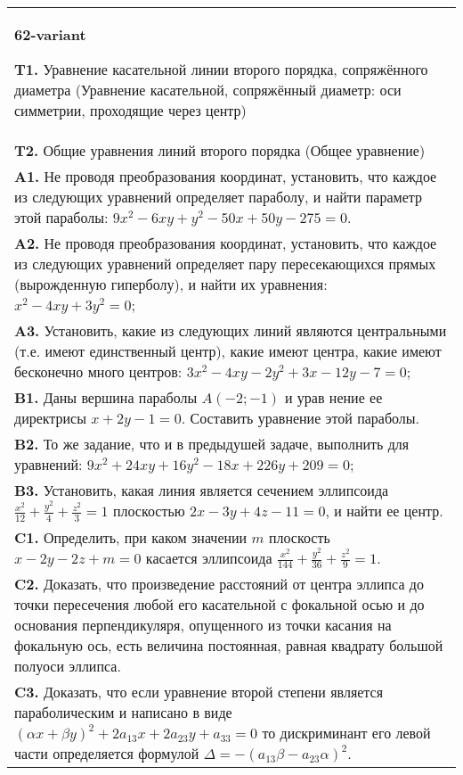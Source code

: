 \documentclass{article}
\begin{document}
\begin{tabular}{m{17cm}}
\textbf{62-variant}
\newline

\textbf{T1.} Уравнение касательной линии второго порядка, сопряжённого диаметра (Уравнение касательной, сопряжённый диаметр: оси симметрии, проходящие через центр) \\
\textbf{T2.} Общие уравнения линий второго порядка (Общее уравнение) \\
\textbf{A1.} Не проводя преобразования координат, установить, что каждое из следующих уравнений определяет параболу, и найти параметр этой параболы: $9 x^2-6 x y+y^2-50 x+50 y-275=0$. \\
\textbf{A2.} Не проводя преобразования координат, установить, что каждое из следующих уравнений определяет пару пересекающихся прямых (вырожденную гиперболу), и найти их уравнения: $x^2-4 x y+3 y^2=0$; \\
\textbf{A3.} Установить, какие из следующих линий являются центральными (т.е. имеют единственный центр), какие имеют центра, какие имеют бесконечно много центров: $3 x^2-4 x y-2 y^2+3 x-12 y-7=0$; \\
\textbf{B1.} Даны вершина параболы $A(-2 ;-1)$ и урав нение ее директрисы $x+2 y-1=0$. Составить уравнение этой параболы. \\
\textbf{B2.} То же задание, что и в предыдушей задаче, выполнить для уравнений: $9 x^2+24 x y+16 y^2-18 x+226 y+209=0$; \\
\textbf{B3.} Установить, какая линия является сечением эллипсоида $\frac{x^2}{12}+\frac{y^2}{4}+\frac{z^2}{3}=1$ плоскостью $2 x-3 y+4 z-11=0$, и найти ее центр. \\
\textbf{C1.} Определить, при каком значении $m$ плоскость $x-2 y-2 z+m=0$ касается эллипсоида $\frac{x^2}{144}+\frac{y^2}{36}+\frac{z^2}{9}=1$. \\
\textbf{C2.} Доказать, что произведение расстояний от центра эллипса до точки пересечения любой его касательной с фокальной осью и до основания перпендикуляря, опущенного из точки касания на фокальную ось, есть величина постоянная, равная квадрату большой полуоси эллипса. \\
\textbf{C3.} Доказать, что если уравнение второй степени является параболическим и написано в виде $ (\alpha x+\beta y) ^2+2a_{13}x+2a_{23}y+a_{33}=0$ то дискриминант его левой части определяется формулой $\Delta=- (a_{13} \beta-a_{23} \alpha) ^2$. \\

\end{tabular}
\vspace{1cm}
\end{document}
